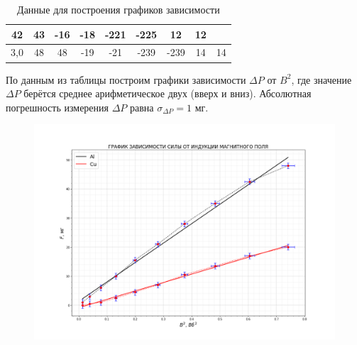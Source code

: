 \documentclass[a4paper,12pt]{article}
\begin{document}
\begin{table}[H]
\begin{tabular}{|c|cccccccc|}
          \multicolumn{1}{c|}{{\color[HTML]{000000} 42}} &
          \multicolumn{1}{c|}{{\color[HTML]{000000} 43}} &
          \multicolumn{1}{c|}{{\color[HTML]{000000} -16}} &
          \multicolumn{1}{c|}{{\color[HTML]{000000} -18}} &
          \multicolumn{1}{c|}{{\color[HTML]{000000} -221}} &
          \multicolumn{1}{c|}{{\color[HTML]{000000} -225}} &
          \multicolumn{1}{c|}{{\color[HTML]{000000} 12}} &
          {\color[HTML]{000000} 12} \\ \hline
        {\color[HTML]{000000} 3,0} &
          \multicolumn{1}{c|}{{\color[HTML]{000000} 48}} &
          \multicolumn{1}{c|}{{\color[HTML]{000000} 48}} &
          \multicolumn{1}{c|}{{\color[HTML]{000000} -19}} &
          \multicolumn{1}{c|}{{\color[HTML]{000000} -21}} &
          \multicolumn{1}{c|}{{\color[HTML]{000000} -239}} &
          \multicolumn{1}{c|}{{\color[HTML]{000000} -239}} &
          \multicolumn{1}{c|}{{\color[HTML]{000000} 14}} &
          {\color[HTML]{000000} 14} \\ \hline
    \end{tabular}
    \caption{Данные для построения графиков зависимости}
\end{table}

По данным из таблицы построим графики зависимости $\Delta P$ от $B^2$, где значение $\Delta P$ берётся среднее арифметическое двух (вверх и вниз). Абсолютная погрешность измерения $\Delta P$ равна $\sigma_{\Delta P } = 1$ мг.

\begin{figure}[H]\label{fig: Al_Cu}
    \centering
    \includegraphics[width = \textwidth]{F(B2)Al_Cu.png}
\end{figure}
\end{document}
